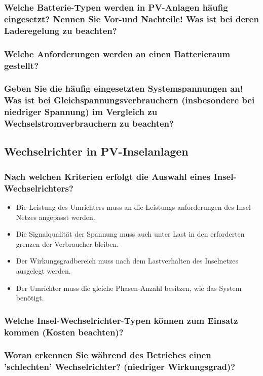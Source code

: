 \subsubsection{Welche Batterie-Typen werden in PV-Anlagen häufig eingesetzt? Nennen Sie Vor-und Nachteile! Was ist bei deren Laderegelung zu beachten?}
\blindtext
\subsubsection{Welche Anforderungen werden an einen Batterieraum gestellt?}
\blindtext
\subsubsection{Geben Sie die häufig eingesetzten Systemspannungen an! Was ist bei Gleichspannungsverbrauchern (insbesondere bei niedriger Spannung) im Vergleich zu Wechselstromverbrauchern zu beachten?}
\blindtext

\subsection{Wechselrichter in PV-Inselanlagen}
\subsubsection{Nach welchen Kriterien erfolgt die Auswahl eines Insel-Wechselrichters?}
\begin{itemize}
    \item Die Leistung des Umrichters muss an die Leistungs anforderungen des Insel-Netzes angepasst werden.
    \item Die Signalqualität der Spannung muss auch unter Last in den erforderten grenzen der Verbraucher bleiben.
    \item Der Wirkungsgradbereich muss nach dem Lastverhalten des Inselnetzes ausgelegt werden.
    \item Der Umrichter muss die gleiche Phasen-Anzahl besitzen, wie das System benötigt.
\end{itemize}
\subsubsection{Welche Insel-Wechselrichter-Typen können zum Einsatz kommen (Kosten beachten)?}
\subsubsection{Woran erkennen Sie während des Betriebes einen 'schlechten' Wechselrichter? (niedriger Wirkungsgrad)?}

